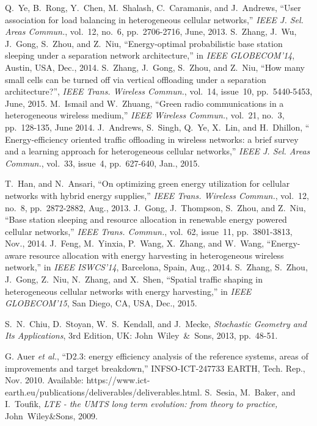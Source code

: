 \documentclass[12pt, draftclsnofoot,onecolumn]{IEEEtran}
\begin{document}
\begin{thebibliography}{100}
     Q.~Ye, B.~Rong, Y.~Chen, M.~Shalash, C.~Caramanis, and J.~Andrews, ``User association for load balancing in heterogeneous cellular networks,'' \emph{IEEE J. Sel. Areas Commun.}, vol.~12, no.~6, pp.~2706-2716, June, 2013.
     S.~Zhang, J.~Wu, J.~Gong, S.~Zhou, and Z.~Niu, ``Energy-optimal probabilistic base station sleeping under a separation network architecture,'' in \emph{IEEE GLOBECOM'14}, Austin, USA, Dec., 2014.
     S.~Zhang, J.~Gong, S.~Zhou, and Z.~Niu, ``How many small cells can be turned off via vertical offloading under a separation architecture?'', \emph{IEEE Trans. Wireless Commun.}, vol.~14, issue~10, pp.~5440-5453, June, 2015.
     M.~Ismail and W.~Zhuang, ``Green radio communications in a heterogeneous wireless medium,'' \emph{IEEE Wireless Commun.}, vol.~21, no.~3, pp.~128-135, June 2014. 
     J.~Andrews, S.~Singh, Q.~Ye, X.~Lin, and H.~Dhillon, ``
    Energy-efficiency oriented traffic offloading in wireless networks: a brief survey and a learning approach for heterogeneous cellular networks,'' \emph{IEEE J. Sel. Areas Commun.}, vol.~33, issue~4, pp.~627-640, Jan., 2015.

     T.~Han, and N.~Ansari, ``On optimizing green energy utilization for cellular networks with hybrid energy supplies,'' \emph{IEEE Trans. Wireless Commun.}, vol.~12, no.~8, pp.~2872-2882, Aug., 2013.
     J.~Gong, J.~Thompson, S.~Zhou, and Z.~Niu, ``Base station sleeping and resource allocation in renewable energy powered cellular networks,'' \emph{IEEE Trans. Commun.}, vol.~62, issue~11, pp.~3801-3813, Nov., 2014.
     J.~Feng, M.~Yinxia, P.~Wang, X.~Zhang, and W.~Wang, ``Energy-aware resource allocation with energy harvesting in heterogeneous wireless network,'' in \emph{IEEE ISWCS'14}, Barcelona, Spain, Aug., 2014.
     S.~Zhang, S.~Zhou, J.~Gong, Z.~Niu, N.~Zhang, and X.~Shen, ``Spatial traffic shaping in heterogeneous cellular networks with energy harvesting,'' in \emph{IEEE GLOBECOM'15}, San Diego, CA, USA, Dec., 2015.

     S.~N.~Chiu, D.~Stoyan, W.~S.~Kendall, and J.~Mecke, \emph{Stochastic Geometry and Its Applications}, 3rd Edition, UK: John~Wiley~\&~Sons, 2013, pp.~48-51.
    
     G. Auer \emph{et al.}, ``D2.3: energy efficiency analysis of the reference systems, areas of improvements and target breakdown,'' INFSO-ICT-247733 EARTH, Tech. Rep., Nov. 2010. Available: https://www.ict-earth.eu/publications/deliverables/deliverables.html.
     S.~Sesia, M.~Baker, and I.~Toufik, \emph{LTE - the UMTS long term evolution: from theory to practice,} John~Wiley\&Sons, 2009.


\end{thebibliography}
\end{document}
